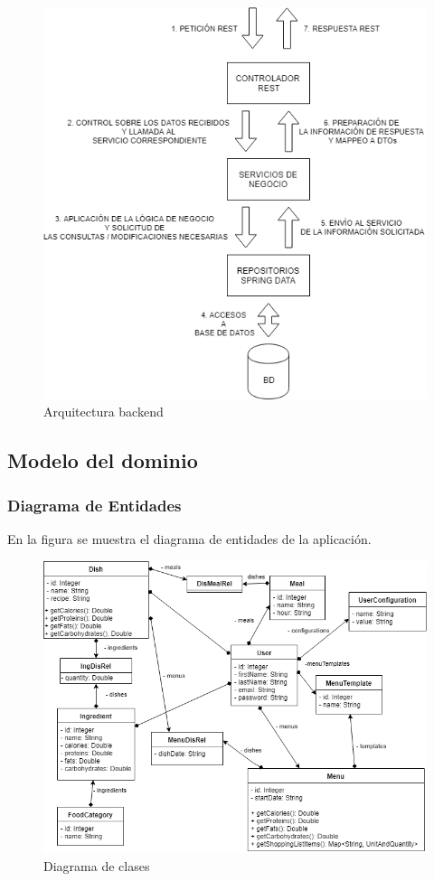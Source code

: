 \documentclass[12pt, a4paper, twoside]{book}
\begin{document}
	\begin{figure}[H]
		\centering
		\includegraphics[width=12cm]{Imagenes/ArquitecturaBack.png}
		\caption{Arquitectura backend}\label{Arquitectura backend}
	\end{figure}
	
	\subsection{Modelo del dominio}    
	\subsubsection{Diagrama de Entidades}
	En la figura se muestra el diagrama de entidades de la aplicación.
	\begin{figure}[H]
		\centering
		\includegraphics[width=15cm]{Imagenes/DiagramaClases.png}
		\caption{Diagrama de clases}\label{Diagrama de clases}
	\end{figure}
\end{document}
